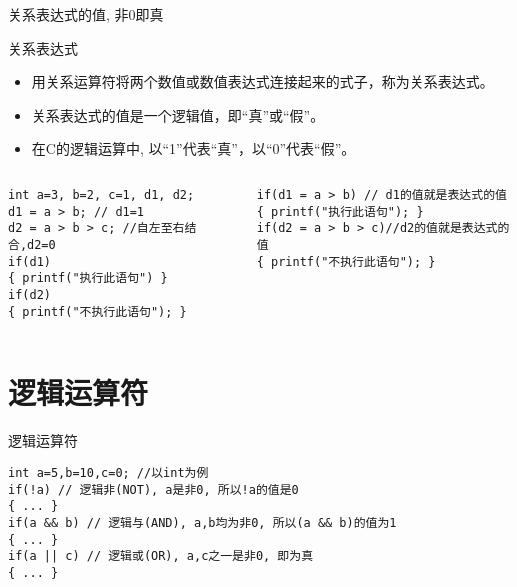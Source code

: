 \begin{frame}{关系表达式的值, 非0即真}
\begin{block}{关系表达式}
	\small
	\begin{itemize}
		\item 用关系运算符将两个数值或数值表达式连接起来的式子，称为关系表达式。
		\item 关系表达式的值是一个逻辑值，即``真''或``假''。
		\item 在C的逻辑运算中, 以``1''代表``真''，以``0''代表``假''。	
	\end{itemize}
\end{block}
\begin{columns}[T]
\begin{lstlisting}
int a=3, b=2, c=1, d1, d2; 
d1 = a > b; // d1=1
d2 = a > b > c; //自左至右结合,d2=0
if(d1)
{ printf("执行此语句") }
if(d2) 
{ printf("不执行此语句"); }
\end{lstlisting}
\begin{lstlisting}
if(d1 = a > b) // d1的值就是表达式的值
{ printf("执行此语句"); }
if(d2 = a > b > c)//d2的值就是表达式的值
{ printf("不执行此语句"); }
\end{lstlisting}
\end{columns}
\end{frame}

\section{逻辑运算符}

\begin{frame}{逻辑运算符}
\begin{lstlisting}
int a=5,b=10,c=0; //以int为例
if(!a) // 逻辑非(NOT), a是非0, 所以!a的值是0
{ ... }
if(a && b) // 逻辑与(AND), a,b均为非0, 所以(a && b)的值为1
{ ... }
if(a || c) // 逻辑或(OR), a,c之一是非0, 即为真
{ ... }
\end{lstlisting}
\end{frame}

